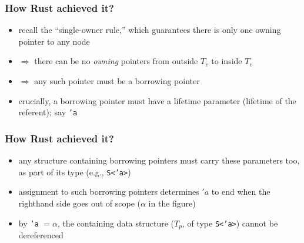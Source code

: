 \documentclass[12pt,dvipdfmx]{beamer}
\newcommand{\ao}[1]{{\color{blue}#1}}
\begin{document}
\begin{frame}
  \frametitle{How Rust achieved it?}
  \begin{itemize}
  \item<1-> recall the ``single-owner rule,'' which guarantees there is
    only one owning pointer to any node
  \item<2-> $\Rightarrow$ there can be no \ao{\it owning} pointers
    from outside $T_v$ to inside $T_v$
  \item<3-> $\Rightarrow$ any such pointer must be a borrowing pointer
  \item<4-> crucially, a borrowing pointer must have a lifetime parameter
    (lifetime of the referent); say {\tt 'a}
  \end{itemize}

  \begin{center}
%
%
%
%
  \end{center}
\end{frame}


\begin{frame}
  \frametitle{How Rust achieved it?}
  \begin{itemize}
  \item<1-> any structure containing borrowing pointers must carry these
    parameters too, as part of its type (e.g., {\tt S<'a>})
  \item<2-> assignment to such borrowing pointers determines $'a$
    to end when the righthand side goes out of scope ($\alpha$ in the figure)
  \item<3-> by {\tt 'a} $= \alpha$, 
    the containing data structure ($T_p$, of type {\tt S<'a>})
    cannot be dereferenced
  \end{itemize}

  \begin{center}
%
%
  \end{center}
\end{frame}
\end{document}
